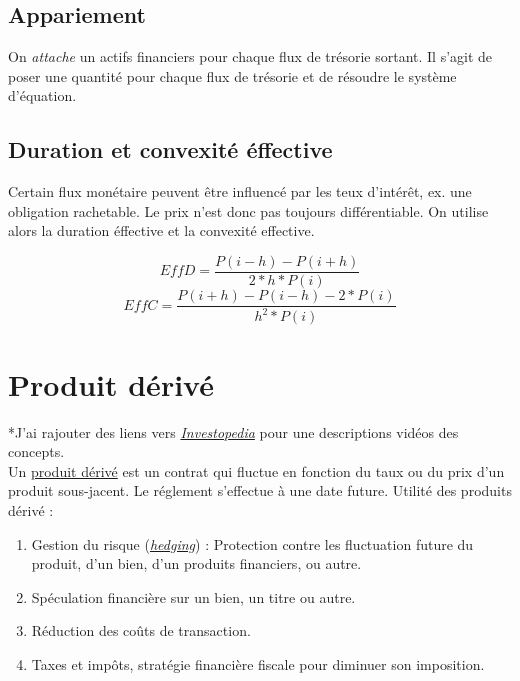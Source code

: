 \documentclass[11pt,french]{report}
\begin{document}
\section{Appariement}
\label{sec:appariement}

On \textit{attache} un actifs financiers pour chaque flux de trésorie sortant. Il s'agit de poser une quantité pour chaque flux de trésorie et de résoudre le système d'équation.

\section{Duration et convexité éffective}
\label{sec:duration effective}

Certain flux monétaire peuvent être influencé par les teux d'intérêt, ex. une obligation rachetable. Le prix n'est donc pas toujours différentiable. On utilise alors la duration éffective et la convexité effective.

\begin{equation}
EffD = \frac{P(i-h)-P(i+h)}{2*h*P(i)}
\end{equation}
\begin{equation}
EffC = \frac{P(i+h)-P(i-h)- 2*P(i)}{h^{2}*P(i)}
\end{equation}




\chapter{Produit dérivé}
\label{cha:produit dérivé}

*J'ai rajouter des liens vers \href{http://www.investopedia.com/?o=40186&l=dir&qsrc=999&qo=investopediaSiteSearch}{\textit{Investopedia}} pour une descriptions vidéos des concepts.
\\Un \href{http://www.investopedia.com/terms/d/derivative.asp?o=40186&l=dir&qsrc=1&qo=serpSearchTopBox&ap=investopedia.com}{produit dérivé} est un contrat qui fluctue en fonction du taux ou du prix d'un produit sous-jacent. Le réglement s'effectue à une date future. Utilité des produits dérivé :
\begin{enumerate}
\item Gestion du risque (\href{http://www.investopedia.com/terms/h/hedge.asp?o=40186&l=dir&qsrc=1&qo=serpSearchTopBox&ap=investopedia.com}{\textit{hedging}}) : Protection contre les fluctuation future du produit, d'un bien, d'un produits financiers, ou autre.
\item Spéculation financière sur un bien, un titre ou autre.
\item Réduction des coûts de transaction.
\item Taxes et impôts, stratégie financière fiscale pour diminuer son imposition.
\end{enumerate}
\end{document}
